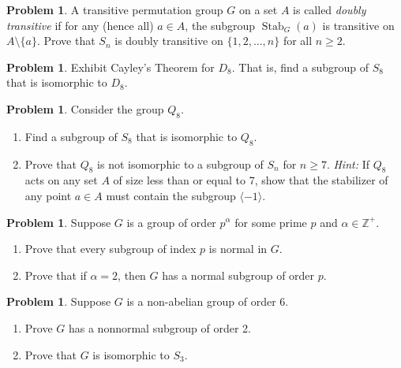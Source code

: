 \documentclass[11pt]{scrartcl}
\theoremstyle{definition}
\newtheorem{problem}[theorem]{Problem}
\DeclareMathOperator{\Stab}{Stab}
\begin{document}
\begin{problem}
A transitive permutation group $G$ on a set $A$ is called \emph{doubly transitive} if for any (hence all) $a\in A$, the subgroup $\Stab_G(a)$ is transitive on $A\setminus\{a\}$. Prove that $S_n$ is doubly transitive on $\{1,2,\ldots,n\}$ for all $n\geq 2$.
\end{problem}

\begin{problem}
Exhibit Cayley's Theorem for $D_8$.  That is, find a subgroup of $S_8$ that is isomorphic to $D_8$.
\end{problem}

\begin{problem}
Consider the group $Q_8$.
\begin{enumerate}[label=\rm{(\alph*)}]
\item Find a subgroup of $S_8$ that is isomorphic to $Q_8$.
\item Prove that $Q_8$ is not isomorphic to a subgroup of $S_n$ for $n\geq 7$. \emph{Hint:} If $Q_8$ acts on any set $A$ of size less than or equal to 7, show that the stabilizer of any point $a\in A$ must contain the subgroup $\langle -1\rangle$.
\end{enumerate}
\end{problem}

\begin{problem}
Suppose $G$ is a group of order $p^{\alpha}$ for some prime $p$ and $\alpha\in\mathbb{Z}^+$.
\begin{enumerate}[label=\rm{(\alph*)}]
\item Prove that every subgroup of index $p$ is normal in $G$.
\item Prove that if $\alpha=2$, then $G$ has a normal subgroup of order $p$.
\end{enumerate}
\end{problem}

\begin{problem}
Suppose $G$ is a non-abelian group of order 6.
\begin{enumerate}[label=\rm{(\alph*)}]
\item Prove $G$ has a nonnormal subgroup of order 2.
\item Prove that $G$ is isomorphic to $S_3$.
\end{enumerate}
\end{problem}
\end{document}
